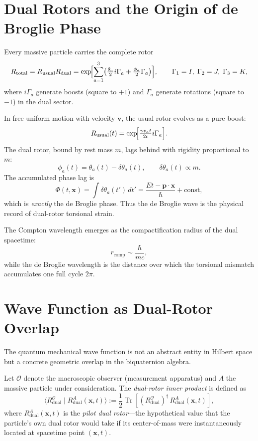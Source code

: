 \documentclass[dvipdfmx,a4paper]{article}
\begin{document}
\section{Dual Rotors and the Origin of de Broglie Phase}

Every massive particle carries the complete rotor
\[
R_\text{total} = R_\text{usual} R_\text{dual}
  = \exp\!\Bigl[\sum_{a=1}^3 \bigl(\tfrac{\theta_a}{2} i\Gamma_a + \tfrac{\phi_a}{2}\Gamma_a\bigr)\Bigr],
\qquad \Gamma_1=I,\;\Gamma_2=J,\;\Gamma_3=K,
\]
where $i\Gamma_a$ generate boosts (square to $+1$) and $\Gamma_a$ generate rotations (square to $-1$) in the dual sector.

In free uniform motion with velocity $\mathbf{v}$, the usual rotor evolves as a pure boost:
\[
R_\text{usual}(t) = \exp\!\Bigl[\tfrac{\gamma v_a t}{2c} i\Gamma_a\Bigr].
\]
The dual rotor, bound by rest mass $m$, lags behind with rigidity proportional to $m$:
\[
\phi_a(t) = \theta_a(t) - \delta\theta_a(t),\qquad
\delta\theta_a(t) \propto m.
\]
The accumulated phase lag is
\[
\Phi(t,\mathbf{x}) = \int \delta\theta_a(t')\,dt'
  = \frac{E t - \mathbf{p}\cdot\mathbf{x}}{\hbar} + \text{const},
\]
which is \emph{exactly} the de Broglie phase. Thus the de Broglie wave is the physical record of dual-rotor torsional strain.

The Compton wavelength emerges as the compactification radius of the dual spacetime:
\[
r_\text{comp} \sim \frac{\hbar}{mc},
\]
while the de Broglie wavelength is the distance over which the torsional mismatch accumulates one full cycle $2\pi$.

\section{Wave Function as Dual-Rotor Overlap}
\label{sec:wavefunction}

The quantum mechanical wave function is not an abstract entity in Hilbert space but a concrete geometric overlap in the biquaternion algebra.

Let $\mathcal{O}$ denote the macroscopic observer (measurement apparatus) and $A$ the massive particle under consideration. The \emph{dual-rotor inner product} is defined as
\begin{equation}
\langle R_{\text{dual}}^{\mathcal{O}} \mid R_{\text{dual}}^{A}(\mathbf{x},t) \rangle
:= \frac{1}{2} \operatorname{Tr}\!\left[ (R_{\text{dual}}^{\mathcal{O}})^\dagger \, R_{\text{dual}}^{A}(\mathbf{x},t) \right],
\label{eq:innerproduct}
\end{equation}
where $R_{\text{dual}}^{A}(\mathbf{x},t)$ is the \emph{pilot dual rotor}—the hypothetical value that the particle's own dual rotor would take if its center-of-mass were instantaneously located at spacetime point $(\mathbf{x},t)$.
\end{document}
